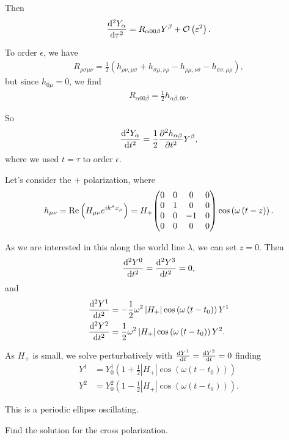Then
\begin{align}
    \dv[2]{Y_\alpha}{\tau} = R_{\alpha 0 0 \beta} Y^{\beta} + \mathcal{O}\left( \varepsilon^2 \right) 
.\end{align}

To order $\epsilon$, we have
\begin{align}
    R_{\rho \sigma \mu \nu} = \frac{1}{2} \left( h_{\rho \nu , \mu \sigma} + h_{\sigma \mu , \nu \rho} - h_{\rho \mu , \nu \sigma} - h_{\sigma \nu , \mu \rho} \right) 
,\end{align}
but since $h_{0 \mu} = 0$, we find
\begin{align}
    R_{\alpha 0 0 \beta} = \frac{1}{2} h_{\alpha \beta , 0 0}
.\end{align}

So
\begin{align}
    \dv[2]{Y_\alpha}{t} = \frac{1}{2} \pdv[2]{h_{\alpha \beta}}{t} Y^{\beta}
,\end{align}
where we used $t = \tau$ to order $\epsilon$.

Let's consider the $+$ polarization, where
\begin{align}
    h_{\mu \nu} = \Re \left( H_{\mu \nu} e^{i k^{\mu} x_{\mu}} \right) = H_+ \mqty( 0 & 0 & 0 & 0 \\ 0& 1 & 0 & 0 \\ 0 & 0 & -1 & 0 \\ 0 & 0 & 0& 0 ) \cos \left( \omega \left( t- z \right)  \right) 
.\end{align}

As we are interested in this along the world line $\lambda$, we can set $z = 0$. Then
\begin{align}
    \dv[2]{Y^{0}}{t} = \dv[2]{Y^{3}}{t} = 0
,\end{align}
and
\begin{align}
    \dv[2]{Y^{1}}{t} &= -\frac{1}{2}\omega^2 \left| H_+ \right| \cos \left( \omega \left( t- t_0 \right)  \right) Y^{1} \\
    \dv[2]{Y^{2}}{t} &= \frac{1}{2} \omega^2 \left| H_+ \right| \cos \left( \omega \left( t - t_0 \right)  \right) Y^2
.\end{align}

As $H_+$ is small, we solve perturbatively with $\dv{Y^{1}}{t} = \dv{Y^{2}}{t} = 0$ finding
\begin{align}
    Y^{1} &= Y^{1}_0 \left( 1 + \frac{1}{2} \left| H_+ \right| \cos \left( \omega \left( t -t_0 \right)  \right)  \right) \\
    Y^{2} &= Y^{2}_0 \left( 1 - \frac{1}{2} \left| H_+ \right| \cos \left( \omega \left( t -t_0 \right)  \right)  \right)
.\end{align}

This is a periodic ellipse oscillating.

\begin{exercise}
    Find the solution for the cross polarization.
\end{exercise}
